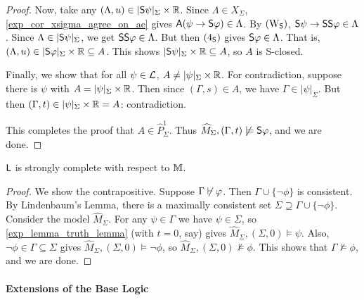 \begin{proof}
    Now, take any $(\Lambda, u) \in |\S\psi|_\Sigma \times \R$.
    Since $\Lambda \in X_\Sigma$, \cref{exp_cor_xsigma_agree_on_ae} gives
    $\A(\psi \limplies \S\phi) \in \Lambda$. By $\weakeningS$,
    $\S\psi \limplies \S\S\phi \in \Lambda$. Since $\Lambda \in
    |\S\psi|_\Sigma$, we get $\S\S\phi \in \Lambda$. But then
    $\foursoundness$ gives $\S\phi \in \Lambda$. That is, $(\Lambda,
    u) \in |\S\phi|_\Sigma \times \R \subseteq A$. This shows
    $|\S\psi|_\Sigma \times \R \subseteq A$, so $A$ is
    S-closed.

    Finally, we show that for all $\psi \in \cL$, $A \ne
    |\psi|_\Sigma \times \R$.  For contradiction, suppose there is
    $\psi$ with $A = |\psi|_\Sigma \times \R$. Then since $(\Gamma,
    s) \in A$, we have $\Gamma \in |\psi|_\Sigma$. But then $(\Gamma,
    t) \in |\psi|_\Sigma \times \R = A$: contradiction.

    This completes the proof that $A \in \widehat{P}_\Sigma^1$.  Thus
    $\widehat{M}_\Sigma, (\Gamma, t) \not\models \S\phi$, and we are done.
\end{proof}

\begin{theorem}
\label{exp_thm_strong_completeness}
    $\sL$ is strongly complete\footnotemark{} with respect to $\M$.
\end{theorem}


\begin{proof}
We show the contrapositive. Suppose $\Gamma \not\entails \phi$.
Then $\Gamma \cup \{\neg\phi\}$ is consistent. By Lindenbaum's
Lemma, there is a maximally consistent set $\Sigma \supseteq \Gamma
\cup \{\neg\phi\}$. Consider the model $\widehat{M}_\Sigma$. For
any $\psi \in \Gamma$ we have $\psi \in \Sigma$, so
\cref{exp_lemma_truth_lemma} (with $t = 0$, say) gives
$\widehat{M}_\Sigma, (\Sigma, 0) \models \psi$. Also,
$\neg\phi \in \Gamma \subseteq \Sigma$ gives
$\widehat{M}_\Sigma, (\Sigma, 0) \models \neg\phi$, so
$\widehat{M}_\Sigma, (\Sigma, 0) \not\models \phi$. This shows that
$\Gamma \not\models \phi$, and we are done.
\end{proof}

\paragraph{Extensions of the Base Logic}

